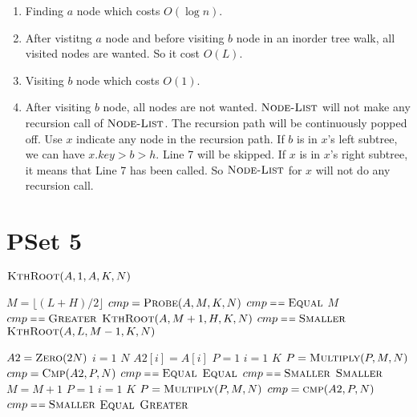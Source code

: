 \documentclass[12pt,twoside]{article}
\begin{document}
\begin{enumerate}
\item Finding $a$ node which costs $O(\log n)$.  
\item After vistitng $a$ node and before visiting $b$ node in an inorder tree walk, all
visited nodes are wanted. So it cost $O(L)$. 
\item Visiting $b$ node which costs $O(1)$.
\item After visiting $b$ node, all nodes are not wanted. $\textnormal{\scshape Node-List}$ will
  not make any recursion call of $\textnormal{\scshape Node-List}$. The recursion path will be
  continuously popped off. Use $x$ indicate any node in the recursion path. If
  $b$ is in $x$'s left subtree, we can have $x.key > b > h$. Line 7 will be
  skipped. If $x$ is in $x$'s right subtree, it means that Line 7 has been
  called. So $\textnormal{\scshape Node-List}$ for $x$ will not do any recursion call.
 
\end{enumerate}


\section{PSet 5}

\begin{codebox}
\li \Return $\textnormal{\scshape KthRoot}(A, 1, A, K, N)$
\end{codebox}

\begin{codebox}
\li $M = \lfloor(L+H)/2\rfloor $
\li $cmp = \textnormal{\scshape Probe}(A, M, K, N)$
\li \If $cmp \isequal \proc{Equal}$
\li \Then \Return $M$
\li \ElseIf $cmp \isequal \proc{Greater}$
\li \Then \Return $\textnormal{\scshape KthRoot}(A, M+1, H, K, N)$
\li \ElseIf $cmp \isequal \proc{Smaller}$
\li \Then \Return $\textnormal{\scshape KthRoot}(A, L, M-1, K, N)$
\End
\end{codebox}

\begin{codebox}
\li $A2 = \textnormal{\scshape Zero}(2N)$
\li \For $i = 1$ \To $N$
\li \Do $A2[i] = A[i]$
\End
\li $P = 1$
\li \For $i = 1$ \To $K$
\li \Do $P = \textnormal{\scshape Multiply}(P, M, N)$
\li $cmp = \textnormal{\scshape Cmp}(A2, P, N)$
\li \If $cmp \isequal \proc{Equal}$
\li \Then \Return $\textnormal{\scshape Equal}$
\li \ElseIf $cmp \isequal \proc{Smaller}$
\li \Then \Return $\textnormal{\scshape Smaller}$
\End
\End
\li $M = M + 1$
\li $P = 1$
\li \For $i = 1$ \To $K$
\li \Do $P = \textnormal{\scshape Multiply}(P, M, N)$
\li $cmp = \textnormal{\scshape cmp}(A2, P, N)$
\li \If $cmp \isequal \proc{Smaller}$
\li \Then \Return $\textnormal{\scshape Equal}$
\End
\End
\li \Return $\textnormal{\scshape Greater}$
\end{codebox}
\end{document}
